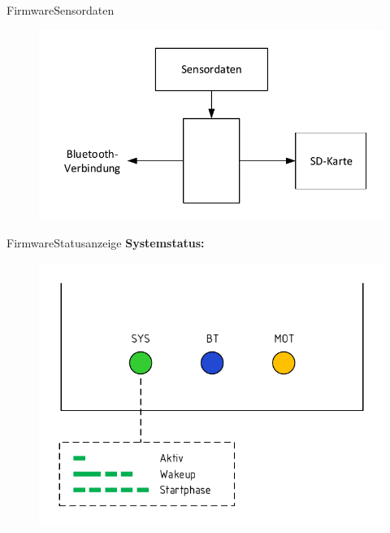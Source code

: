 \documentclass{beamer}
\begin{document}
\begin{frame}{Firmware}{Sensordaten}
    \begin{figure}
        \centering
        \includegraphics[width=\textwidth]{./img/Datenverteilung.pdf}
    \end{figure}
\end{frame}

\begin{frame}{Firmware}{Statusanzeige}
    \textbf{Systemstatus:}
    \begin{figure}[H]
        \includegraphics[width=.8\textwidth]{./img/Systemstatus.pdf}
    \end{figure}
\end{frame}
\end{document}
